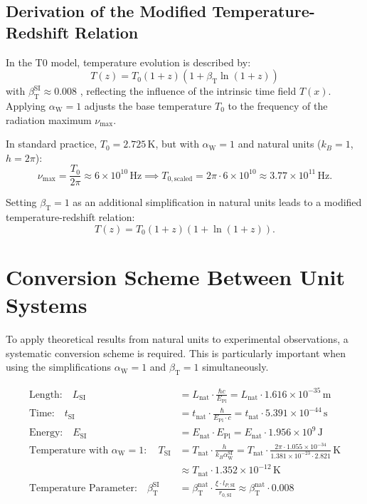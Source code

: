 \documentclass[12pt,a4paper]{article}
\newcommand{\Tfield}{T(x)}
\newcommand{\betaT}{\beta_{\text{T}}}
\newcommand{\alphaW}{\alpha_{\text{W}}}
\begin{document}
	\subsection{Derivation of the Modified Temperature-Redshift Relation}
	
	In the T0 model, temperature evolution is described by:
	\begin{equation}
		T(z) = T_0 (1 + z) (1 + \betaT \ln(1 + z))
	\end{equation}
	with \(\betaT^{\text{SI}} \approx 0.008\) \cite{pascher_messdifferenzen_2025}, reflecting the influence of the intrinsic time field \(\Tfield\). Applying \(\alphaW = 1\) adjusts the base temperature \(T_0\) to the frequency of the radiation maximum \(\nu_{\text{max}}\).
	
	In standard practice, \(T_0 = 2.725 \, \text{K}\), but with \(\alphaW = 1\) and natural units (\(k_B = 1\), \(h = 2\pi\)):
	\[
	\nu_{\text{max}} = \frac{T_0}{2\pi} \approx 6 \times 10^{10} \, \text{Hz} \implies T_{0,\text{scaled}} = 2\pi \cdot 6 \times 10^{10} \approx 3.77 \times 10^{11} \, \text{Hz}.
	\]
	
	Setting \(\betaT = 1\) as an additional simplification in natural units leads to a modified temperature-redshift relation:
	\[
	T(z) = T_0 (1 + z) (1 + \ln(1 + z)).
	\]
	
	\section{Conversion Scheme Between Unit Systems}
	
	To apply theoretical results from natural units to experimental observations, a systematic conversion scheme is required. This is particularly important when using the simplifications \(\alphaW = 1\) and \(\betaT = 1\) simultaneously.
	
	\begin{tcolorbox}[colback=blue!5!white,colframe=blue!75!black,title=Conversion Scheme Between Unit Systems]
		\begin{align}
			\text{Length:} \quad L_{\text{SI}} &= L_{\text{nat}} \cdot \frac{\hbar c}{E_{\text{Pl}}} = L_{\text{nat}} \cdot 1.616 \times 10^{-35} \, \text{m} \\
			\text{Time:} \quad t_{\text{SI}} &= t_{\text{nat}} \cdot \frac{\hbar}{E_{\text{Pl}} \cdot c} = t_{\text{nat}} \cdot 5.391 \times 10^{-44} \, \text{s} \\
			\text{Energy:} \quad E_{\text{SI}} &= E_{\text{nat}} \cdot E_{\text{Pl}} = E_{\text{nat}} \cdot 1.956 \times 10^9 \, \text{J} \\
			\text{Temperature with } \alphaW = 1: \quad T_{\text{SI}} &= T_{\text{nat}} \cdot \frac{h}{k_B \alphaW^{\text{SI}}} = T_{\text{nat}} \cdot \frac{2\pi \cdot 1.055 \times 10^{-34}}{1.381 \times 10^{-23} \cdot 2.821} \, \text{K} \\
			&\approx T_{\text{nat}} \cdot 1.352 \times 10^{-12} \, \text{K} \\
			\text{Temperature Parameter:} \quad \betaT^{\text{SI}} &= \betaT^{\text{nat}} \cdot \frac{\xi \cdot l_{P,\text{SI}}}{r_{0,\text{SI}}} \approx \betaT^{\text{nat}} \cdot 0.008
		\end{align}
	\end{tcolorbox}
	
\end{document}
